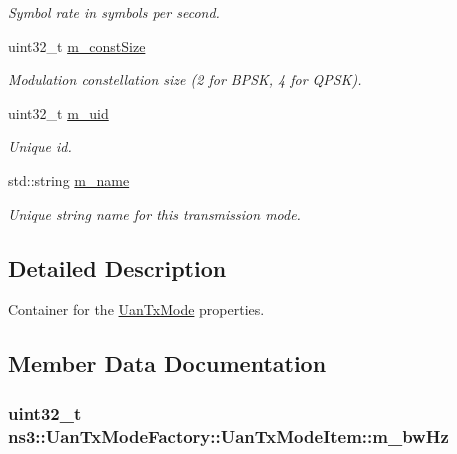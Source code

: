 \begin{DoxyCompactItemize}
\begin{DoxyCompactList}\small\item\em Symbol rate in symbols per second. \end{DoxyCompactList}\item 
uint32\+\_\+t \hyperlink{structns3_1_1UanTxModeFactory_1_1UanTxModeItem_a06c0c6d72f91de8bae1f614f43547344}{m\+\_\+const\+Size}
\begin{DoxyCompactList}\small\item\em Modulation constellation size (2 for B\+P\+SK, 4 for Q\+P\+SK). \end{DoxyCompactList}\item 
uint32\+\_\+t \hyperlink{structns3_1_1UanTxModeFactory_1_1UanTxModeItem_aa0d23f52c8c71f969151df2c7fe1dfed}{m\+\_\+uid}
\begin{DoxyCompactList}\small\item\em Unique id. \end{DoxyCompactList}\item 
std\+::string \hyperlink{structns3_1_1UanTxModeFactory_1_1UanTxModeItem_a77e999c089f24dec09739720ef5e10ea}{m\+\_\+name}
\begin{DoxyCompactList}\small\item\em Unique string name for this transmission mode. \end{DoxyCompactList}\end{DoxyCompactItemize}


\subsection{Detailed Description}
Container for the \hyperlink{classns3_1_1UanTxMode}{Uan\+Tx\+Mode} properties. 

\subsection{Member Data Documentation}
\subsubsection[{\texorpdfstring{m\+\_\+bw\+Hz}{m_bwHz}}]{\setlength{\rightskip}{0pt plus 5cm}uint32\+\_\+t ns3\+::\+Uan\+Tx\+Mode\+Factory\+::\+Uan\+Tx\+Mode\+Item\+::m\+\_\+bw\+Hz}\hypertarget{structns3_1_1UanTxModeFactory_1_1UanTxModeItem_aa61e87467ba9e819a7600bb483c7b056}{}\label{structns3_1_1UanTxModeFactory_1_1UanTxModeItem_aa61e87467ba9e819a7600bb483c7b056}



